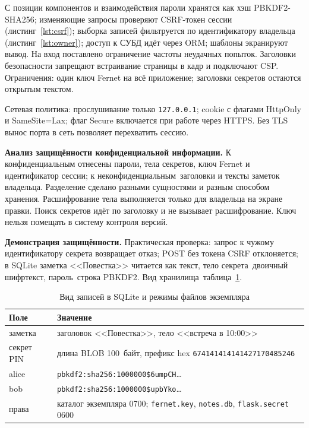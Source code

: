 С позиции компонентов и взаимодействия пароли хранятся как хэш PBKDF2-SHA256; изменяющие запросы проверяют CSRF-токен сессии (листинг~\ref{lst:csrf}); выборка записей фильтруется по идентификатору владельца (листинг~\ref{lst:owner}); доступ к СУБД идёт через ORM; шаблоны экранируют вывод. На вход поставлено ограничение частоты неудачных попыток. Заголовки безопасности запрещают встраивание страницы в кадр и подключают CSP. Ограничения: один ключ Fernet на всё приложение; заголовки секретов остаются открытым текстом.

Сетевая политика: прослушивание только \texttt{127.0.0.1}; cookie с флагами HttpOnly и SameSite=Lax; флаг Secure включается при работе через HTTPS. Без TLS вынос порта в сеть позволяет перехватить сессию.

\textbf{Анализ защищённости конфиденциальной информации.}
К конфиденциальным отнесены пароли, тела секретов, ключ Fernet и идентификатор сессии; к неконфиденциальным~\mdash  заголовки и тексты заметок владельца. Разделение сделано разными сущностями и разным способом хранения. Расшифрование тела выполняется только для владельца на экране правки. Поиск секретов идёт по заголовку и не вызывает расшифрование. Ключ нельзя помещать в систему контроля версий.

\textbf{Демонстрация защищённости.}
Практическая проверка: запрос к чужому идентификатору секрета возвращает отказ; POST без токена CSRF отклоняется; в SQLite заметка <<Повестка>> читается как текст, тело секрета~\mdash  двоичный шифртекст, пароль~\mdash  строка PBKDF2. Вид хранилища~\mdash  таблица~\ref{tab:store}.

\begin{table}[ht]
	\begin{tabularx}{\textwidth}{|l|X|}
		\hline
		\textbf{Поле} & \textbf{Значение} \\
		\hline
		заметка & заголовок <<Повестка>>, тело <<встреча в 10:00>> \\
		\hline
		секрет PIN & длина BLOB 100~байт, префикс hex \texttt{674141414141427170485246} \\
		\hline
		alice & \texttt{pbkdf2:sha256:1000000\$6umpCH}\ldots \\
		\hline
		bob & \texttt{pbkdf2:sha256:1000000\$upbYko}\ldots \\
		\hline
		права & каталог экземпляра 0700; \texttt{fernet.key}, \texttt{notes.db}, \texttt{flask.secret} 0600 \\
		\hline
	\end{tabularx}
	\caption{Вид записей в SQLite и режимы файлов экземпляра}
	\label{tab:store}
\end{table}

